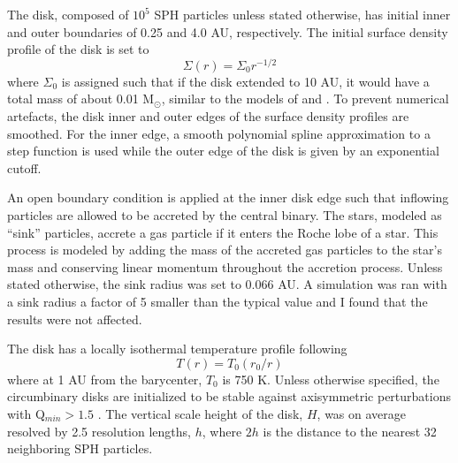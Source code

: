 The disk, composed of $10^5$ SPH particles unless stated otherwise, has initial inner and outer boundaries of 0.25 and 4.0 AU,
respectively.  The initial surface density profile of the disk is set to 
\begin{equation}
\Sigma(r) = \Sigma_0 r^{-1/2}
\end{equation}
 where $\Sigma_0$ is assigned such that if the disk extended to 10 AU, it would have a total mass of about 0.01 
M$_{\odot}$, similar to the models of \citet{Pierens2007} and \citet{Kley2014}.  To prevent numerical 
artefacts, the disk inner and outer edges of the surface density profiles are smoothed.  For the inner edge, a smooth polynomial spline approximation to a step function is used while the outer edge of the disk is given by an exponential cutoff.
 
An open boundary condition is applied at the inner disk edge such that inflowing particles are allowed to be accreted
by the central binary.  The stars, modeled as ``sink'' particles, accrete a gas particle if it enters the Roche lobe of a star.  This process is modeled by adding the mass of the accreted gas particles to the star's mass and conserving linear momentum throughout the accretion process.  Unless stated otherwise, the 
sink radius was set to 0.066 AU.  A simulation was ran with a sink radius a factor of 5 smaller than the typical value and I found that the results were not 
affected.
 
The disk has a locally isothermal temperature profile following 
\begin{equation}
\label{CBDisk:eqn:disc_temp_profile}
T(r) = T_0(r_0/r)
\end{equation}
where at 1 AU from the barycenter, $T_0$ is
750 K.  Unless otherwise specified, the circumbinary disks are initialized to be stable against axisymmetric perturbations with Q$_{min} > 1.5$ \citep{Toomre1964}.
The vertical scale height of the disk, $H$, was on average resolved by
  2.5 resolution lengths, $h$, where $2 h$ is the distance
to the nearest 32 neighboring SPH particles.

